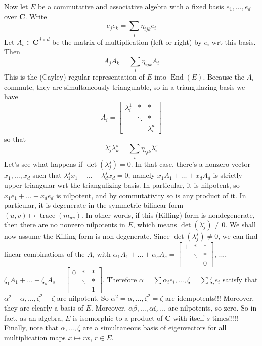 \documentclass[english]{article}
\def\C{\mathbf{C}}
\DeclareMathOperator\End{End}
\DeclareMathOperator\trace{trace}
\begin{document}
Now let $E$ be a commutative and associative algebra with a fixed basis $e_1,\dots,e_d$ over $\C$. Write $$e_je_k=\sum_i \eta_{ijk}e_i$$
Let $A_i\in\C^{d\times d}$ be the matrix of multiplication (left or right) by $e_i$ wrt this basis. Then $$A_jA_k=\sum_i\eta_{ijk}A_i$$ 
This is the (Cayley) regular representation of $E$ into $\End(E)$. Because the $A_i$ commute, they are simultaneously triangulable, so in a triangulazing basis we have $$A_i=\left[\begin{array}{ccc}
\lambda_{i}^{1} & * & *\\
 & \ddots & *\\
 &  & \lambda_{i}^{d}
\end{array}\right]$$
so that $$\lambda_{j}^s\lambda_k^s=\sum_i \eta_{ijk}\lambda_i^s$$
Let's see what happens if $\det(\lambda_j^s)=0$. In that case, there's a nonzero vector $x_1,\dots,x_d$ such that $\lambda_1^sx_1+\dots+\lambda_d^sx_d=0$, namely $x_1A_1+\dots+x_dA_d$ is strictly upper triangular wrt the triangulizing basis. In particular, it is nilpotent, so $x_1e_1+\dots+x_de_d$ is nilpotent, and by commutativity so is any product of it. In particular, it is degenerate in the symmetric bilinear form $(u,v)\mapsto \trace(m_{uv})$. In other words, if this (Killing) form is nondegenerate, then there are no nonzero nilpotents in $E$, which means $\det(\lambda_j^s)\neq 0$. We shall now assume the Killing form is non-degenerate. Since $\det(\lambda_j^s)\neq 0$, we can find linear combinations of the $A_i$ with $\alpha_{1}A_{1}+\dots+\alpha_{s}A_{s}=\left[\begin{array}{ccc}
1 & * & *\\
 & \ddots & *\\
 &  & 0
\end{array}\right]$, ..., $\zeta_{1}A_{1}+\dots+\zeta_{s}A_{s}=\left[\begin{array}{ccc}
0 & * & *\\
 & \ddots & *\\
 &  & 1
\end{array}\right]$. Therefore $\alpha=\sum \alpha_i e_i,\dots,\zeta=\sum \zeta_i e_i$ satisfy that $\alpha^2-\alpha,\dots,\zeta^2-\zeta$ are nilpotent. So $\alpha^2=\alpha,\dots,\zeta^2=\zeta$ are idempotents!!! Moreover, they are clearly a basis of $E$. Moreover, $\alpha\beta,\dots,\alpha\zeta,\dots$ are nilpotents, so zero. So in fact, as an algebra, $E$ is isomorphic to a product of $\C$ with itself $s$ times!!!!!\\
Finally, note that $\alpha,\dots,\zeta$ are a simultaneous basis of eigenvectors for all multiplication maps $x\mapsto rx$, $r\in E$. 
\\\\
\end{document}

